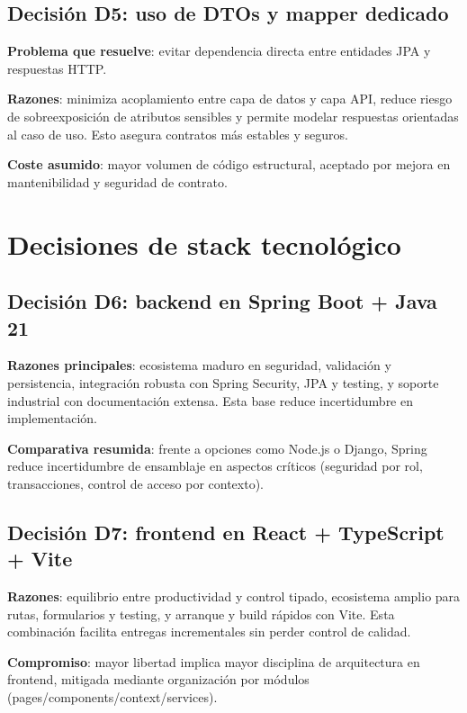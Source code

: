\subsection{Decisi\'on D5: uso de DTOs y mapper dedicado}

\textbf{Problema que resuelve}:
evitar dependencia directa entre entidades JPA y respuestas HTTP.

\textbf{Razones}: minimiza acoplamiento entre capa de datos y capa API, reduce riesgo de sobreexposici\'on de atributos sensibles y permite modelar respuestas orientadas al caso de uso. Esto asegura contratos m\'as estables y seguros.

\textbf{Coste asumido}:
mayor volumen de c\'odigo estructural,
aceptado por mejora en mantenibilidad y seguridad de contrato.

\FloatBarrier
\section{Decisiones de stack tecnol\'ogico}

\subsection{Decisi\'on D6: backend en Spring Boot + Java 21}

\textbf{Razones principales}: ecosistema maduro en seguridad, validaci\'on y persistencia, integraci\'on robusta con Spring Security, JPA y testing, y soporte industrial con documentaci\'on extensa. Esta base reduce incertidumbre en implementaci\'on.

\textbf{Comparativa resumida}:
frente a opciones como Node.js o Django,
Spring reduce incertidumbre de ensamblaje en aspectos cr\'iticos
(seguridad por rol, transacciones, control de acceso por contexto).

\subsection{Decisi\'on D7: frontend en React + TypeScript + Vite}

\textbf{Razones}: equilibrio entre productividad y control tipado, ecosistema amplio para rutas, formularios y testing, y arranque y build r\'apidos con Vite. Esta combinaci\'on facilita entregas incrementales sin perder control de calidad.

\textbf{Compromiso}:
mayor libertad implica mayor disciplina de arquitectura en frontend,
mitigada mediante organizaci\'on por m\'odulos (pages/components/context/services).

